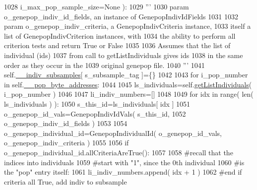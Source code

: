 \begin{DoxyCode}
1028                                             i\_max\_pop\_sample\_size=\textcolor{keywordtype}{None} ):
1029         \textcolor{stringliteral}{'''}
1030 \textcolor{stringliteral}{        param o\_genepop\_indiv\_id\_fields, an instance of GenepopIndivIdFields}
1031 \textcolor{stringliteral}{}
1032 \textcolor{stringliteral}{        param o\_genepop\_indiv\_criteria, a GenepopIndivCriteria instance,}
1033 \textcolor{stringliteral}{            itself a list of GenepopIndivCriterion instances, with}
1034 \textcolor{stringliteral}{            the ability to perform all criterion tests and return True or False}
1035 \textcolor{stringliteral}{}
1036 \textcolor{stringliteral}{        Assumes that the list of individual (ids)}
1037 \textcolor{stringliteral}{        from call to getListIndividuals gives ids}
1038 \textcolor{stringliteral}{        in the same order as they occur in the }
1039 \textcolor{stringliteral}{        original genepop file.}
1040 \textcolor{stringliteral}{        '''}
1041         self.\hyperlink{classnegui_1_1genepopfilemanager_1_1GenepopFileManager_a1e8379bcee4902ca9314ff53fcb71644}{\_\_indiv\_subsamples}[ s\_subsample\_tag ]=\{\}
1042 
1043         \textcolor{keywordflow}{for} i\_pop\_number \textcolor{keywordflow}{in} self.\hyperlink{classnegui_1_1genepopfilemanager_1_1GenepopFileManager_ae24c2bdd19136a345bdb42fd49c5d91f}{\_\_pop\_byte\_addresses}:
1044 
1045             ls\_individuals=self.\hyperlink{classnegui_1_1genepopfilemanager_1_1GenepopFileManager_aa6993dde24163002aeae55005437711d}{getListIndividuals}( i\_pop\_number )
1046 
1047             li\_indiv\_numbers=[]
1048 
1049             \textcolor{keywordflow}{for} idx \textcolor{keywordflow}{in} range( len( ls\_individuals ) ):
1050                 s\_this\_id=ls\_individuals[ idx ]
1051                 o\_genepop\_id\_vals=GenepopIndivIdVals( s\_this\_id, 
1052                                             o\_genepop\_indiv\_id\_fields )
1053 
1054                 o\_genepop\_individual\_id=GenepopIndividualId( o\_genepop\_id\_vals, o\_genepop\_indiv\_criteria )
1055                 
1056                 \textcolor{keywordflow}{if} o\_genepop\_individual\_id.allCriteriaAreTrue():
1057 
1058                     \textcolor{comment}{#recall that the indices into individuals }
1059                     \textcolor{comment}{#start with "1", since the 0th individual}
1060                     \textcolor{comment}{#is the "pop" entry itself:}
1061                     li\_indiv\_numbers.append( idx + 1 )
1062                 \textcolor{comment}{#end if criteria all True, add indiv to subsample}

\end{DoxyCode}
